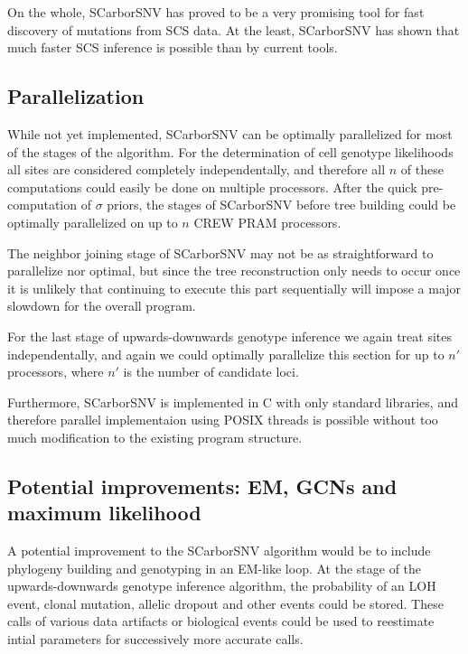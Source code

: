 \documentclass[../main.tex]{subfiles}
\begin{document}
On the whole, SCarborSNV has proved to be a very promising tool for fast discovery of mutations from SCS data.
At the least, SCarborSNV has shown that much faster SCS inference is possible than by current tools.

\subsection{Parallelization}
While not yet implemented, SCarborSNV can be optimally parallelized for most of the stages of the algorithm.
For the determination of cell genotype likelihoods all sites are considered completely independentally, and therefore all $n$ of these computations could easily be done on multiple processors.
After the quick pre-computation of $\sigma$ priors, the stages of SCarborSNV before tree building could be optimally parallelized on up to $n$ CREW PRAM processors.

The neighbor joining stage of SCarborSNV may not be as straightforward to parallelize nor optimal, but since the tree reconstruction only needs to occur once it is unlikely that continuing to execute this part sequentially will impose a major slowdown for the overall program.

For the last stage of upwards-downwards genotype inference we again treat sites independentally, and again we could optimally parallelize this section for up to $n'$ processors, where $n'$ is the number of candidate loci.

Furthermore, SCarborSNV is implemented in C with only standard libraries, and therefore parallel implementaion using POSIX threads is possible without too much modification to the existing program structure.

\subsection{Potential improvements: EM, GCNs and maximum likelihood}
A potential improvement to the SCarborSNV algorithm would be to include phylogeny building and genotyping in an EM-like loop.
At the stage of the upwards-downwards genotype inference algorithm, the probability of an LOH event, clonal mutation, allelic dropout and other events could be stored.
These calls of various data artifacts or biological events could be used to reestimate intial parameters for successively more accurate calls.
\end{document}
